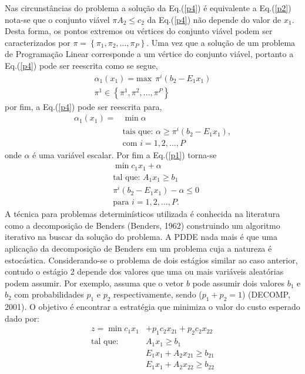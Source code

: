 \documentclass[12pt,fleqn]{article}
\begin{document}
Nas circunst\^ancias do problema a solu\c c\~ao da Eq.(\ref{p4}) \'e equivalente a Eq.(\ref{p2})
nota-se que o conjunto vi\'avel $\pi A_2 \leq c_2$ da Eq.(\ref{p4}) n\~ao depende do valor de $x_1$. Desta forma, os
pontos extremos ou v\'ertices do conjunto vi\'avel podem ser caracterizados por $\pi = \left\{ \pi_1, \pi_2, \dots,
\pi_P \right\}$. Uma vez
que a solu\c c\~ao de um problema de Programa\c c\~ao Linear corresponde  a um v\'ertice do conjunto vi\'avel,
portanto a Eq.(\ref{p4}) pode ser reescrita como se segue,
\begin{equation*}
  \begin{aligned}
	{\alpha}_{1}(x_1) = \text {max} \ \ {\pi}^{i} (b_2 - E_1x_1) \\
	{\pi}^{1} \in \left\{ {\pi}^{1}, {\pi}^{2},\dots, {\pi}^{P} \right\}
  \end{aligned}
	\label{p5}
\end{equation*}
por fim, a Eq.(\ref{p4}) pode ser reescrita para, 
\begin{align}
  	\alpha_{1}(x_1) =& \min\alpha \nonumber\\ 
	&\mbox{tais que: }\alpha \geq \pi^{i}(b_2 - E_1 x_1),\nonumber\\ &\mbox{com } i = 1,2, \dots , P
	\label{p6}
\end{align}
onde $\alpha$ \'e uma vari\'avel escalar. Por fim a Eq.(\ref{p1}) torna-se
\begin{align}
&\min c_1x_1 + \alpha \nonumber\\
&\mbox{tal que: }	A_1 x_1 \geq b_1 \nonumber\\
&	\pi^{i}(b_2 - E_1x_1) - \alpha \leq 0\nonumber \\ 
&\mbox{para }	i = 1, 2, \dots , P.
	\label{p7}
\end{align}
A t\'ecnica para problemas determin\'isticos utilizada \'e conhecida na literatura como a decomposi\c c\~ao de Benders
(Benders, 1962)
construindo um algoritmo iterativo na buscar da solu\c c\~ao do problema. A PDDE nada
mais \'e que uma aplica\c c\~ao da decomposi\c c\~ao de Benders em um problema cuja a
natureza \'e
 estoc\'astica. Considerando-se o problema de dois est\'agios similar ao caso anterior, contudo o  est\'agio 2 depende dos valores
que uma ou mais vari\'aveis aleat\'orias podem assumir. Por exemplo, assuma que o vetor $b$ pode assumir dois valores $b_1$ e $b_2$ com
probabilidades $p_1$ e $p_2$ respectivamente, sendo ($p_1 + p_2 = 1$) (DECOMP, 2001). O objetivo \'e encontrar a estrat\'egia que minimiza o
valor do custo esperado dado por:
\begin{align}
  z = \min  c_1x_1 &+ p_1c_2x_{21} + p_2c_2x_{22} \nonumber\\	
 \mbox{tal que: }&	A_1 x_1 \geq b_1\nonumber \\
	&E_1 x_1 + A_2 x_{21} \geq b_{21} \nonumber\\
	&E_1 x_1 + A_2x_{22} \geq b_{22}
  	\label{pd1}
\end{align}
\end{document}
